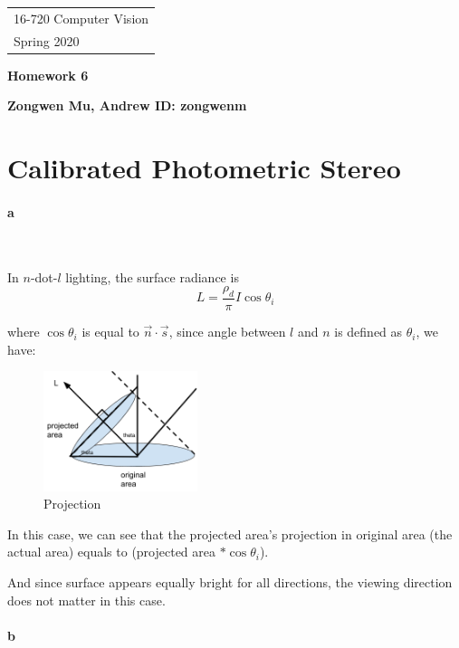 \documentclass[11pt]{article} \usepackage{fullpage} \usepackage{graphicx} \usepackage{epstopdf} \usepackage{color} \usepackage{psfrag} \usepackage{pdfsync}\usepackage{indentfirst}\usepackage{subfigure}\usepackage{float}\usepackage[section]{placeins}
\begin{document}
{\parindent 0pt \begin{tabular}[t]{l} 16-720 Computer Vision \\ Spring 2020 \end{tabular}}%
\parindent 0pt \parskip 8pt
\begin{center} \large\bf Homework 6 \end{center}
\begin{center} \large\bf Zongwen Mu, Andrew ID: zongwenm \end{center}
\bigskip


\section{Calibrated Photometric Stereo}

\setlength{\parindent}{2em}  

\paragraph{a}~{}

In $n$-dot-$l$ lighting, the surface radiance is 
\begin{equation}
	L = \frac{\rho_d}{\pi}I\cos\theta_i
\end{equation}

where $\cos\theta_i$ is equal to $\vec{n}\cdot\vec{s}$, since angle between $l$ and $n$ is defined as $\theta_i$, we have:
\begin{figure}[H]
\centering
\includegraphics[width=0.4\textwidth]{results/projected_1.png}
\caption{Projection}
\end{figure}

In this case, we can see that the projected area's projection in original area (the actual area) equals to (projected area $* \cos\theta_i$).

And since surface appears equally bright for all directions, the viewing direction does not matter in this case.

\paragraph{b}~{}
\end{document}
